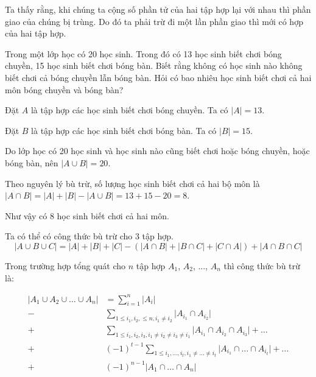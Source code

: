 Ta thấy rằng, khi chúng ta cộng số phần tử của hai tập hợp lại
với nhau thì phần giao của chúng bị trùng. Do đó ta phải trừ
đi một lần phần giao thì mới có hợp của hai tập hợp.

\begin{example}
    Trong một lớp học có 20 học sinh. Trong đó có 13 học sinh
    biết chơi bóng chuyền, 15 học sinh biết chơi bóng bàn. Biết
    rằng không có học sinh nào không biết chơi cả bóng chuyền lẫn
    bóng bàn. Hỏi có bao nhiêu học sinh biết chơi cả hai môn bóng
    chuyền và bóng bàn?
\end{example}

\begin{solution}
    Đặt $A$ là tập hợp các học sinh biết chơi bóng chuyền. Ta có
    $\lvert A \rvert = 13$.

    Đặt $B$ là tập hợp các học sinh biết chơi bóng bàn. Ta có
    $\lvert B \rvert = 15$.

    Do lớp học có 20 học sinh và học sinh nào cũng biết chơi
    hoặc bóng chuyền, hoặc bóng bàn, nên $\lvert A \cup B \rvert
    = 20$.

    Theo nguyên lý bù trừ, số lượng học sinh biết chơi cả hai
    bộ môn là $\lvert A \cap B \rvert = \lvert A \rvert +
    \lvert B \rvert - \lvert A \cup B \rvert = 13 + 15 - 20 = 8$.

    Như vậy có 8 học sinh biết chơi cả hai môn.
\end{solution}

Ta có thể có công thức bù trừ cho 3 tập hợp.
\begin{equation}
    \lvert A \cup B \cup C \rvert = \lvert A \rvert + \lvert B \rvert
    + \lvert C \rvert - (\lvert A \cap B \rvert + \lvert B \cap C \rvert
    + \lvert C \cap A \rvert) + \lvert A \cap B \cap C \rvert
\end{equation}

Trong trường hợp tổng quát cho $n$ tập hợp $A_1$, $A_2$, ..., $A_n$
thì công thức bù trừ là:

\begin{equation}
\begin{split}
    \lvert A_1 \cup A_2 \cup \ldots \cup A_n \rvert & =
    \sum_{i=1}^{n} \lvert A_i \rvert \\ - & \sum_{1 \leq i_1, i_2, \leq n
    , i_1 \neq i_2} \lvert A_{i_1} \cap A_{i_2} \rvert \\
    + & \sum_{1 \leq i_1, i_2, i_3, i_1 \neq i_2 \neq i_3 \neq i_1}
    \lvert A_{i_1} \cap A_{i_2} \cap A_{i_3} \rvert + \ldots \\ + 
    & (-1)^{t-1} \sum_{1 \leq i_1, \ldots, i_t, i_1 \neq \ldots \neq i_t}
    \lvert A_{i_1} \cap \ldots \cap A_{i_t} \rvert + \ldots \\ +
    & (-1)^{n-1} \lvert A_1 \cap \ldots \cap A_n \rvert
\end{split}
\end{equation}

